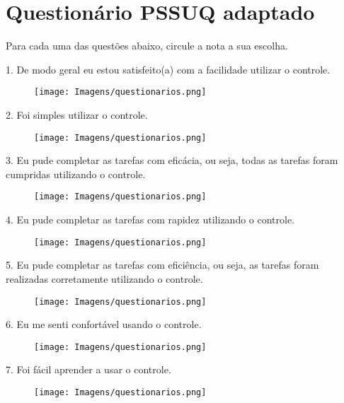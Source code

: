 \chapter{Questionário PSSUQ adaptado}
\label{a.apendice2}
\begin{flushleft}
Para cada uma das questões abaixo, circule a nota a sua escolha.

1. De modo geral eu estou satisfeito(a) com a facilidade utilizar o controle.
\begin{figure}[H]	
	\centering
	\texttt{[image: Imagens/questionarios.png]}
	\label{f.questionarios}
\end{figure}

2. Foi simples utilizar o controle. 
\begin{figure}[H]	
	\centering
	\texttt{[image: Imagens/questionarios.png]}
	\label{f.questionarios}
\end{figure}

3. Eu pude completar as tarefas com eficácia, ou seja, todas as tarefas foram cumpridas utilizando o controle.
\begin{figure}[H]	
	\centering
	\texttt{[image: Imagens/questionarios.png]}
	\label{f.questionarios}
\end{figure}

4. Eu pude completar as tarefas com rapidez utilizando o controle.
\begin{figure}[H]	
	\centering
	\texttt{[image: Imagens/questionarios.png]}
	\label{f.questionarios}
\end{figure}

5. Eu pude completar as tarefas com eficiência, ou seja, as tarefas foram realizadas corretamente utilizando o controle.
\begin{figure}[H]	
	\centering
	\texttt{[image: Imagens/questionarios.png]}
	\label{f.questionarios}
\end{figure}

6. Eu me senti confortável usando o controle.
\begin{figure}[H]	
	\centering
	\texttt{[image: Imagens/questionarios.png]}
	\label{f.questionarios}
\end{figure}


7. Foi fácil aprender a usar o controle.
\begin{figure}[H]	
	\centering
	\texttt{[image: Imagens/questionarios.png]}
	\label{f.questionarios}
\end{figure}


\end{flushleft}
